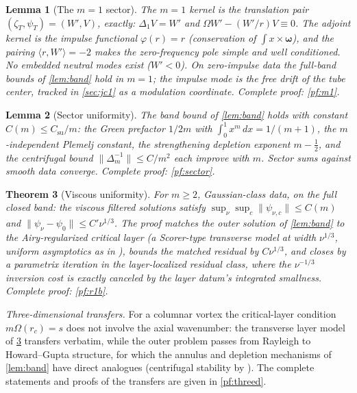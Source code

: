 \documentclass[11pt,letterpaper]{amsart}
\newtheorem{theorem}{Theorem}[section]
\newtheorem{lemma}[theorem]{Lemma}
\theoremstyle{definition}
\theoremstyle{remark}
\newcommand{\vort}{\boldsymbol{\omega}}
\newcommand{\norm}[1]{\lVert #1 \rVert}
\begin{document}
\begin{lemma}[The $m=1$ sector]\label{lem:m1}
The $m=1$ kernel is the translation pair $(\zeta_T,\psi_T)=(W',V)$, exactly:
$\Delta_1V=W'$ and $\Omega W'-(W'/r)V\equiv0$. The adjoint kernel is the impulse
functional $\varphi(r)=r$ (conservation of $\int x\times\vort$), and the pairing
$\langle r,W'\rangle=-2$ makes the zero-frequency pole simple and well conditioned. No
embedded neutral modes exist ($W'<0$). On zero-impulse data the full-band bounds of
\cref{lem:band} hold in $m=1$; the impulse mode is the free drift of the tube center,
tracked in \cref{sec:jc1} as a modulation coordinate. Complete proof: \cref{pf:m1}.
\end{lemma}

\begin{lemma}[Sector uniformity]\label{lem:sector}
The band bound of \cref{lem:band} holds with constant $C(m)\le C_{\mathrm{su}}/m$:
the Green prefactor $1/2m$ with $\int_0^1x^m\,dx=1/(m+1)$, the $m$-independent
Plemelj constant, the strengthening depletion exponent $m-\tfrac12$, and the
centrifugal bound $\norm{\Delta_m^{-1}}\le C/m^2$ each improve with $m$. Sector sums
against smooth data converge. Complete proof: \cref{pf:sector}.
\end{lemma}

\begin{theorem}[Viscous uniformity]\label{thm:r1b}
For $m\ge2$, Gaussian-class data, on the full closed band: the viscous filtered
solutions satisfy $\sup_\nu\sup_c\norm{\psi_{\nu,c}}\le C(m)$ and
$\norm{\psi_\nu-\psi_0}\le C'\nu^{1/3}$. The proof matches the outer solution of
\cref{lem:band} to the Airy-regularized critical layer (a Scorer-type transverse
model at width $\nu^{1/3}$, uniform asymptotics as in \cite{Olver1974}), bounds the
matched residual by $C\nu^{1/3}$, and closes by a parametrix iteration in the
layer-localized residual class, where the $\nu^{-1/3}$ inversion cost is exactly
canceled by the layer datum's integrated smallness. Complete proof: \cref{pf:r1b}.
\end{theorem}

\emph{Three-dimensional transfers.} For a columnar vortex the critical-layer condition
$m\Omega(r_c)=s$ does not involve the axial wavenumber: the transverse layer model of
\cref{thm:r1b} transfers verbatim, while the outer problem passes from Rayleigh to
Howard--Gupta structure, for which the annulus and depletion mechanisms of
\cref{lem:band} have direct analogues (centrifugal stability by
\cite{GallaySmets2020}). The complete statements and proofs of the transfers are given
in \cref{pf:threed}.
\end{document}
